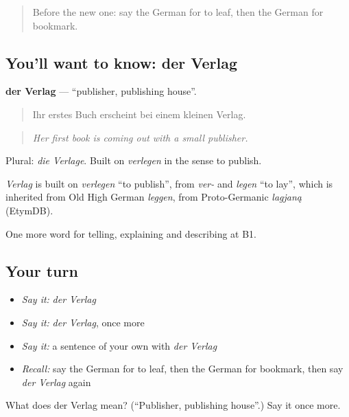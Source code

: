 \begin{quote}
Before the new one: say the German for to leaf, then the German for bookmark.
\end{quote}

\subsection*{You'll want to know: der Verlag}
\textbf{der Verlag} — \textquotedblleft{}publisher, publishing house\textquotedblright{}.

\begin{quote}
Ihr erstes Buch erscheint bei einem kleinen Verlag.
\end{quote}

\begin{quote}
\emph{Her first book is coming out with a small publisher.}
\end{quote}

Plural: \emph{die Verlage}. Built on \emph{verlegen} in the sense to publish.

\begin{cousinweb}
\emph{Verlag} is built on \emph{verlegen} \textquotedblleft{}to publish\textquotedblright{}, from \emph{ver-} and \emph{legen} \textquotedblleft{}to lay\textquotedblright{}, which is inherited from Old High German \emph{leggen}, from Proto-Germanic \emph{lagjaną} (EtymDB).
\end{cousinweb}

\begin{grammarlens}[title={What you've built}]
One more word for telling, explaining and describing at B1.
\end{grammarlens}

\subsection*{Your turn}
\begin{itemize}
\raggedright
  \item \emph{Say it:} \emph{der Verlag}
  \item \emph{Say it:} \emph{der Verlag}, once more
  \item \emph{Say it:} a sentence of your own with \emph{der Verlag}
  \item \emph{Recall:} say the German for to leaf, then the German for bookmark, then say \emph{der Verlag} again
\end{itemize}

\begin{tcolorbox}[breakable,colback=teal!4,colframe=teal!35!black,title={Before you move on}]
What does der Verlag mean? (\textquotedblleft{}Publisher, publishing house\textquotedblright{}.) Say it once more.
\end{tcolorbox}
